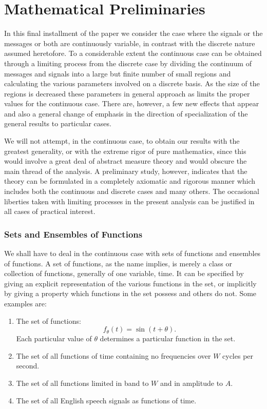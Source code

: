 \clearpage\setcounter{footnote}{0}
\part{Mathematical Preliminaries}

In this final installment of the paper we
consider the case where the signals or the messages or both are
continuously variable, in contrast with the discrete nature assumed
heretofore.  To a considerable extent the continuous case can be obtained
through a limiting process from the discrete case by dividing the
continuum of messages and signals into a large but finite number of small
regions and calculating the various parameters involved on a discrete
basis.  As the size of the regions is decreased these parameters in general
approach as limits the proper values for the continuous case.  There are,
however, a few new effects that appear and also a general change of
emphasis in the direction of specialization of the general results to
particular cases.

We will not attempt, in the continuous case, to obtain our results with the
greatest generality, or with the extreme rigor of pure mathematics, since
this would involve a great deal of abstract measure theory and would
obscure the main thread of the analysis.  A preliminary study, however,
indicates that the theory can be formulated in a completely axiomatic and
rigorous manner which includes both the continuous and discrete cases and
many others.  The occasional liberties taken with limiting processes in the
present analysis can be justified in all cases of practical interest.

\section{Sets and Ensembles of Functions}

We shall have to deal in the continuous case with sets of functions and
ensembles of functions.  A set of functions, as the name implies, is merely
a class or collection of functions, generally of one variable, time.  It
can be specified by giving an explicit representation of the various
functions in the set, or implicitly by giving a property which functions
in the set possess and others do not.  Some examples are:
\begin{enumerate}
\item
The set of functions:
$$
f_\theta(t)=\sin(t+\theta).
$$
Each particular value of $\theta$ determines a particular function in the
set.
\item
The set of all functions of time containing no frequencies over $W$
cycles per second.
\item
The set of all functions limited in band to $W$ and in amplitude to $A$.
\item
The set of all English speech signals as functions of time.
\end{enumerate}

